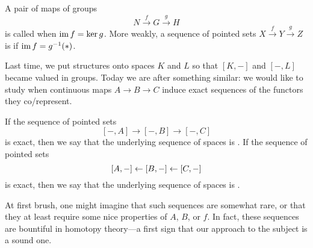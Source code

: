 \begin{definition}
A pair of maps of groups \[N \xrightarrow f G \xrightarrow g H\] is called  when $\operatorname{im} f = \ker g$.
More weakly, a sequence of pointed sets $X \xrightarrow f Y \xrightarrow g Z$ is  if $\operatorname{im} f = g^{-1}(*)$.
\end{definition}

\noindent
Last time, we put structures onto spaces $K$ and $L$ so that $[K, -]$ and $[-, L]$ became valued in groups.
Today we are after something similar: we would like to study when continuous maps $A \to B \to C$ induce exact sequences of the functors they co/represent.

\begin{definition}
If the sequence of pointed sets \[[-, A] \to [-, B] \to [-, C]\] is exact, then we say that the underlying sequence of spaces is .
If the sequence of pointed sets \[[A, -] \leftarrow [B, -] \leftarrow [C, -]\] is exact, then we say that the underlying sequence of spaces is .%
\end{definition}

At first brush, one might imagine that such sequences are somewhat rare, or that they at least require some nice properties of $A$, $B$, or $f$.%
In fact, these sequences are bountiful in homotopy theory---a first sign that our approach to the subject is a sound one.

